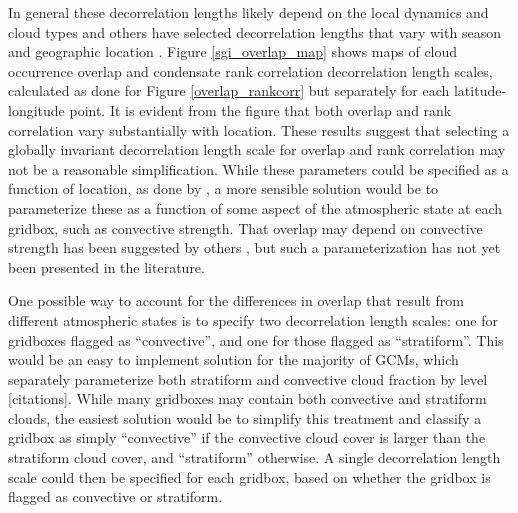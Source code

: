 In general these decorrelation lengths likely depend on the local dynamics and cloud types \citep[e.g.,][]{pincus_et_al_2005} and others have selected decorrelation lengths that vary with season and geographic location \citep[e.g.,][]{raisanen_et_al_2004, oreopoulos_et_al_2012}. Figure \ref{sgi_overlap_map} shows maps of cloud occurrence overlap and condensate rank correlation decorrelation length scales, calculated as done for Figure \ref{overlap_rankcorr} but separately for each latitude-longitude point. It is evident from the figure that both overlap and rank correlation vary substantially with location. These results suggest that selecting a globally invariant decorrelation length scale for overlap and rank correlation may not be a reasonable simplification. While these parameters could be specified as a function of location, as done by \cite{oreopoulos_et_al_2012}, a more sensible solution would be to parameterize these as a function of some aspect of the atmospheric state at each gridbox, such as convective strength. That overlap may depend on convective strength has been suggested by others \citep{pincus_et_al_2005}, but such a parameterization has not yet been presented in the literature. %


One possible way to account for the differences in overlap that result from different atmospheric states is to specify two decorrelation length scales: one for gridboxes flagged as ``convective'', and one for those flagged as ``stratiform''. This would be an easy to implement solution for the majority of GCMs, which separately parameterize both stratiform and convective cloud fraction by level [citations]. While many gridboxes may contain both convective and stratiform clouds, the easiest solution would be to simplify this treatment and classify a gridbox as simply ``convective'' if the convective cloud cover is larger than the stratiform cloud cover, and ``stratiform'' otherwise. A single decorrelation length scale could then be specified for each gridbox, based on whether the gridbox is flagged as convective or stratiform.

